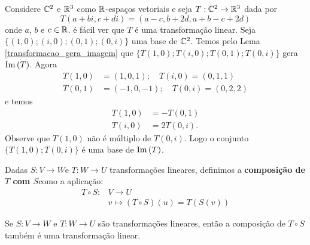 \begin{exemplo}
    Considere $\mathbb{C}^2$ e $\mathbb{R}^3$ como $\mathbb{R}$-espaços vetoriais e seja $T : \mathbb{C}^2 \to \mathbb{R}^3$ dada por
    \[
        T(a+bi, c+di) = (a - c, b + 2d, a + b - c + 2d)
    \]
    onde $a$, $b$ e $c \in \mathbb{R}$. é fácil ver que $T$ é uma transformação linear. Seja $\{(1,0);(i,0);(0,1);(0,i)\}$ uma base de $\mathbb{C}^2$. Temos pelo Lema \ref{transformacao_gera_imagem} que $\{T(1,0);T(i,0);T(0,1);T(0,i)\}$ gera ${\rm Im\,}(T)$. Agora
    \begin{align*}
        T(1,0) &= (1,0,1);\quad T(i,0) = (0,1,1)\\
        T(0,1) &= (-1,0,-1);\quad T(0,i) = (0,2,2)
    \end{align*}
    e temos
    \begin{align*}
        T(1,0) &= -T(0,1)\\
        T(i,0) &= 2T(0,i).
    \end{align*}
    Observe que $T(1,0)$ não é múltiplo de $T(0,i)$. Logo o conjunto $\{T(1,0); T(0,i)\}$ é uma base de ${\rm Im\,}(T)$.
\end{exemplo}

\begin{definicao}
    Dadas $S \colon V \to W$e $T \colon W \to U$ transformações lineares, definimos a \textbf{composição de $T$ com $S$}como a aplicação:
    \begin{align*}
        T \circ S \colon &V \to U\\
        &v \mapsto (T\circ S)(u) = T(S(v))
    \end{align*}
\end{definicao}

\begin{proposicao}
    Se $S \colon V \to W$ e $T \colon W \to U$ são transformações lineares, então a composição de $T\circ S$ também é uma transformação linear.
\end{proposicao}

